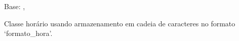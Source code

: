 \documentclass[letterpaper,10pt,brazil]{sphinxmanual}
\begin{document}
\begin{fulllineitems}
\label{\detokenize{estrutarq.campo:estrutarq.campo.campo_tempo.CampoHoraFixo}}
\pysigstartsignatures
{}
\pysigstopsignatures
\sphinxAtStartPar
Base: {\hyperref[\detokenize{estrutarq.dado:estrutarq.dado.DadoFixo}]{}}, {\hyperref[\detokenize{estrutarq.campo:estrutarq.campo.campo_tempo.CampoTempoBasicoFixo}]{}}

\sphinxAtStartPar
Classe horário usando armazenamento em cadeia de caracteres no formato
‘formato\_hora’.

\end{fulllineitems}

\end{document}
